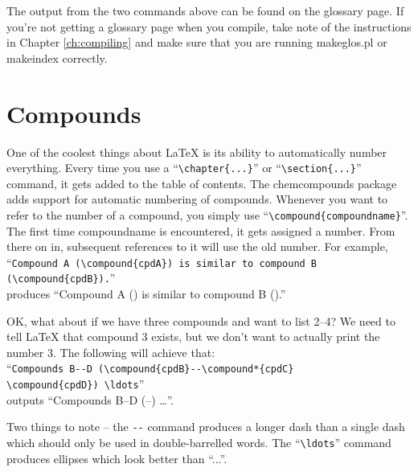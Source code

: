 \normalsize\doublespacing
The output from the two commands above can be found on the glossary page.  If you're not getting a glossary page when you compile, take note of the instructions in Chapter \ref{ch:compiling} and make sure that you are running makeglos.pl or makeindex correctly.

\section{Compounds}

One of the coolest things about \LaTeX{} is its ability to automatically number everything.  Every time you use a ``\small\verb$\chapter{...}$\normalsize'' or ``\small\verb$\section{...}$\normalsize'' command, it gets added to the table of contents.  The chemcompounds package adds support for automatic numbering of compounds.  Whenever you want to refer to the number of a compound, you simply use ``\small\verb$\compound{compoundname}$\normalsize''.  The first time compoundname is encountered, it gets assigned a number.  From there on in, subsequent references to it will use the old number.  For example,\\
``\small\verb$Compound A (\compound{cpdA}) is similar to compound B$\\
\verb$(\compound{cpdB}).$\normalsize''\\
produces ``Compound A () is similar to compound B ().''

OK, what about if we have three compounds and want to list 2--4?  We need to tell \LaTeX{} that compound 3 exists, but we don't want to actually print the number 3.  The following will achieve that:\\
``\small\verb$Compounds B--D (\compound{cpdB}--\compound*{cpdC}$\\
\verb$\compound{cpdD}) \ldots$\normalsize''\\
outputs ``Compounds B--D (--) \ldots''.

Two things to note -- the \small\verb$--$\normalsize{} command produces a longer dash than a single dash which should only be used in double-barrelled words.  The ``\small\verb$\ldots$\normalsize'' command produces ellipses which look better than ``...''.


